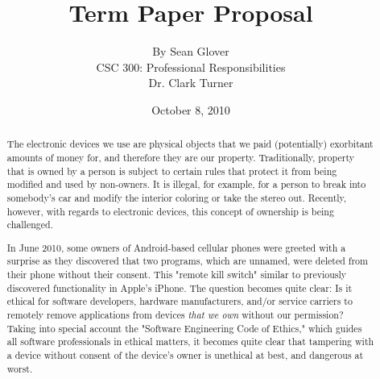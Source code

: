 \documentclass[12pt]{article}
\begin{document}
\title{\vfill Term Paper Proposal} %
\author{
 By Sean Glover \vspace{10pt} \\ 
CSC 300: Professional Responsibilities  \vspace{10pt} \\ 
Dr. Clark Turner \vspace{10pt} \\ 
}
\date{October 8, 2010} %

\maketitle

\vfill  %
\begin{abstract}
The electronic devices we use are physical objects that we paid (potentially) exorbitant amounts of money for, and therefore they are our property. Traditionally, property that is owned by a person is subject to certain rules that protect it from being modified and used by non-owners. It is illegal, for example, for a person to break into somebody's car and modify the interior coloring or take the stereo out. Recently, however, with regards to electronic devices, this concept of ownership is being challenged.

In June 2010, some owners of Android-based cellular phones were greeted with a surprise as they discovered that two programs, which are unnamed, were deleted from their phone without their consent. \cite{AndroidBlog} This "remote kill switch" similar to previously discovered functionality in Apple's iPhone. \cite{iPhoneKill} The question becomes quite clear: Is it ethical for software developers, hardware manufacturers, and/or service carriers to remotely remove applications from devices \emph{that we own} without our permission? Taking into special account the "Software Engineering Code of Ethics," which guides all software professionals in ethical matters, it becomes quite clear that tampering with a device without consent of the device's owner is unethical at best, and dangerous at worst.
\end{abstract}

\thispagestyle{empty} %
\newpage



\end{document}
